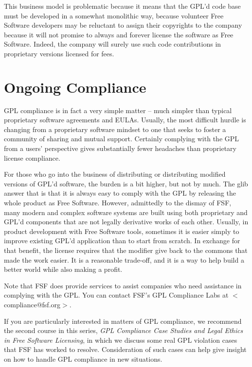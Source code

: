 \documentclass[12pt]{report}
\begin{document}
This business model is problematic because it means that the GPL'd code
base must be developed in a somewhat monolithic way, because volunteer
Free Software developers may be reluctant to assign their copyrights to
the company because it will not promise to always and forever license the
software as Free Software.  Indeed, the company will surely use such code
contributions in proprietary versions licensed for fees.

\section{Ongoing Compliance}

GPL compliance is in fact a very simple matter -- much simpler than
typical proprietary software agreements and EULAs.  Usually, the most
difficult hurdle is changing from a proprietary software mindset to one
that seeks to foster a community of sharing and mutual support.  Certainly
complying with the GPL from a users' perspective gives substantially fewer
headaches than proprietary license compliance.

For those who go into the business of distributing or distributing
modified versions of GPL'd software, the burden is a bit higher, but not
by much.  The glib answer that is that it is always easy to comply with
the GPL by releasing the whole product as Free Software.  However,
admittedly to the dismay of FSF, many modern and complex software systems
are built using both proprietary and GPL'd components that are not
legally derivative works of each other.  Usually, in product development
with Free Software tools, sometimes it is easier simply to improve
existing GPL'd application than to start from scratch.  In exchange for
that benefit, the license requires that the modifier give back to the
commons that made the work easier.  It is a reasonable trade-off, and it
is a way to help build a better world while also making a profit.

Note that FSF does provide services to assist companies who need
assistance in complying with the GPL.  You can contact FSF's GPL
Compliance Labs at $<$compliance@fsf.org$>$.

If you are particularly interested in matters of GPL compliance, we
recommend the second course in this series, {\em GPL Compliance Case
  Studies and Legal Ethics in Free Software Licensing\/}, in which we
discuss some real GPL violation cases that FSF has worked to resolve.
Consideration of such cases can help give insight on how to handle GPL
compliance in new situations.
\end{document}
